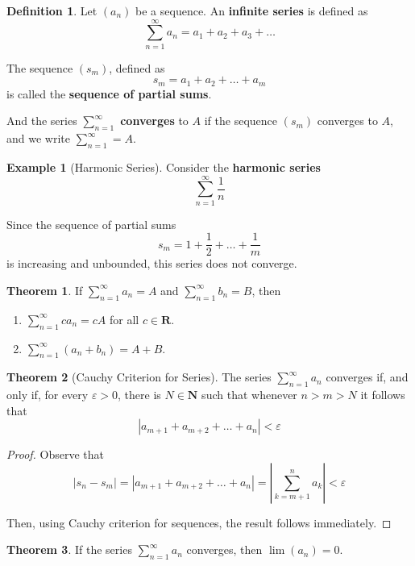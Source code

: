 \documentclass[12pt,a4paper]{article}
\theoremstyle{definition}
\newtheorem{theorem}{Theorem}[section]
\newtheorem{example}{Example}[section]
\newtheorem{definition}{Definition}[section]
\begin{document}
\begin{definition}
	Let $(a_n)$ be a sequence. An \textbf{infinite series} is defined as
	\[
		\sum_{n=1}^\infty a_n = a_1 + a_2 + a_3 + \ldots
	\]
	
	The sequence $(s_m)$, defined as
	\[
		s_m = a_1 + a_2 + \ldots + a_m
	\]
	is called the \textbf{sequence of partial sums}.
	
	And the series $\sum_{n=1}^\infty$ \textbf{converges} to $A$ if the sequence $(s_m)$ converges to $A$, and we write $\sum_{n=1}^\infty = A$.
\end{definition}

\begin{example}[Harmonic Series]
	Consider the \textbf{harmonic series}
	\[
		\sum_{n=1}^\infty \frac{1}{n}
	\]
	
	Since the sequence of partial sums
	\[
		s_m = 1 + \frac{1}{2} + \ldots + \frac{1}{m}
	\]
	is increasing and unbounded, this series does not converge. 
\end{example}

\begin{theorem}
	If $\sum_{n=1}^\infty a_n = A$ and $\sum_{n=1}^\infty b_n = B$, then
	\begin{enumerate}
		\item $\sum_{n=1}^\infty c a_n = cA$ for all $c \in \textbf{R}$.
		\item $\sum_{n=1}^\infty (a_n + b_n) = A + B$.
	\end{enumerate}
\end{theorem}

\begin{theorem}[Cauchy Criterion for Series]
	The series $\sum_{n=1}^\infty a_n$ converges if, and only if, for every $\varepsilon > 0$, there is $N \in \textbf{N}$ such that whenever $n > m > N$ it follows that
	\[
		| a_{m+1} + a_{m+2} + \ldots + a_n | < \varepsilon
	\]
\end{theorem}

\begin{proof}
	Observe that
	\[
		| s_n - s_m | = | a_{m+1} + a_{m+2} + \ldots + a_n | = \left| \sum_{k=m+1}^n a_k \right| < \varepsilon
	\]
	
	Then, using Cauchy criterion for sequences, the result follows immediately. 
\end{proof}

\begin{theorem}
	If the series $\sum_{n=1}^\infty a_n$ converges, then $\lim (a_n) = 0$.
\end{theorem}
\end{document}
